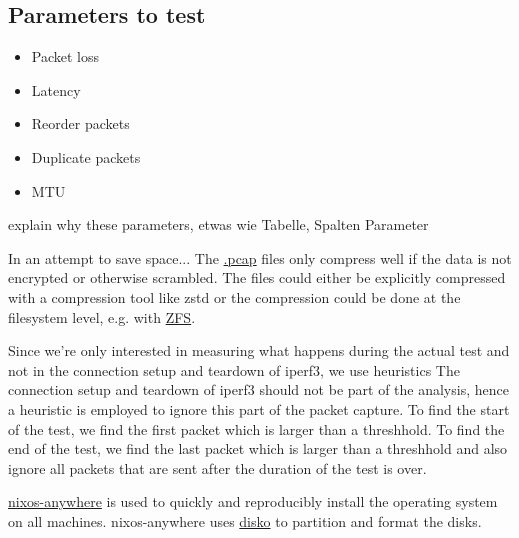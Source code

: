 \subsection{Parameters to test}
\begin{itemize}
  \item Packet loss
  \item Latency
  \item Reorder packets
  \item Duplicate packets
  \item MTU
\end{itemize}
explain why these parameters, etwas wie Tabelle, Spalten Parameter







In an attempt to save space...
The \href{https://en.wikipedia.org/wiki/Pcap}{.pcap} files only compress well if the data is not encrypted or otherwise scrambled.
The files could either be explicitly compressed with a compression tool like zstd or the compression could be done at the filesystem level, e.g. with \href{https://openzfs.org/wiki/Main_Page}{ZFS}.


Since we're only interested in measuring what happens during the actual test and not in the connection setup and teardown of iperf3, we use heuristics
The connection setup and teardown of iperf3 should not be part of the analysis, hence a heuristic is employed to ignore this part of the packet capture. To find the start of the test, we find the first packet which is larger than a threshhold. To find the end of the test, we find the last packet which is larger than a threshhold and also ignore all packets that are sent after the duration of the test is over.


\href{https://github.com/nix-community/nixos-anywhere}{nixos-anywhere} is used to quickly and reproducibly install the operating system on all machines.
nixos-anywhere uses \href{https://github.com/nix-community/disko}{disko} to partition and format the disks.



